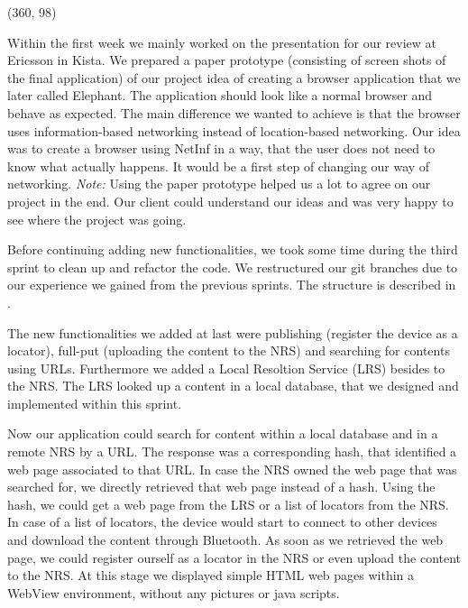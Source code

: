 
\framebox(360, 98){
}

Within the first week we mainly worked on the presentation for our review at Ericsson in Kista.
We prepared a paper prototype (consisting of screen shots of the final application) of our 
project idea of creating a browser application that we later called
Elephant.
The application should look like a normal browser and behave as expected. The main difference
we wanted to achieve is that the browser uses information-based networking instead of location-based
networking. Our idea was to create a browser using NetInf in a way, that the user does not
need to know what actually happens. It would be a first step of changing our way of 
networking. \textit{Note:} Using the paper prototype helped us a lot to agree on our
project in the end. Our client could understand our ideas and was very happy to
see where the project was going.

Before continuing adding new functionalities, we took some time during the third sprint
to clean up and refactor the code. We restructured our git branches due to our
experience we gained from the previous sprints. The structure is described in .

The new functionalities we added at last were publishing (register the 
device as a locator), full-put (uploading the content to the NRS) and
searching for contents using URLs. Furthermore we added a Local Resoltion Service (LRS)
besides to the NRS. The LRS looked up a content in a local database, that we
designed and implemented within this sprint. 

Now our application could search for content within a local database and in a remote
NRS by a URL. The response was a corresponding hash, that identified a
web page associated to that URL. In case the NRS owned the web page that
was searched for, we directly retrieved that web page instead of a hash.
Using the hash, we could get a web page from the LRS or a list of locators
from the NRS. In case of a list of locators, the device would start to
connect to other devices and download the content through Bluetooth.
As soon as we retrieved the web page, we could register ourself as a 
locator in the NRS or even upload the content to the NRS.
At this stage we displayed simple HTML web pages within a WebView environment, without any pictures or
java scripts.


